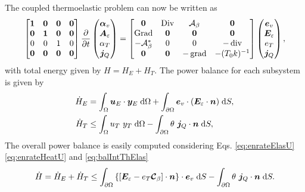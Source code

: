 The coupled thermoelastic problem can now be written as
\begin{equation}\label{eq:phsysElasHeat}
\begin{bmatrix}
\bm{1} & \bm{0} & \bm{0} & \bm{0}\\
\bm{0} & \bm{1} & \bm{0} & \bm{0}\\
0 & 0 & 1 & 0\\
\bm{0} & \bm{0} & \bm{0} & \bm{0}\\
\end{bmatrix}
\diffp{}{t}
\begin{pmatrix}
\bm{\alpha}_v \\
\bm{A}_\varepsilon \\
{\alpha}_T \\
\bm{j}_Q \\
\end{pmatrix} = 
\begin{bmatrix}
\bm{0} & \Div & \mathcal{A}_\beta & \bm{0}\\
\Grad & \bm{0} & \bm{0} & \bm{0} \\
- \mathcal{A}_\beta^* & 0 & 0 & -\div \\
\bm{0} & \bm{0} & -\grad & - (T_0 k)^{-1} \\
\end{bmatrix}
\begin{pmatrix}
\bm{e}_v \\
\bm{E}_\varepsilon \\
{e}_T \\
\bm{j}_Q \\
\end{pmatrix},
\end{equation}
with total energy given by $H=H_E + H_T$. The power balance for each subsystem is given by 
\begin{align}
\dot{H}_E &= \int_\Omega \bm{u}_E \cdot \bm{y}_E \d\Omega + \int_{\partial\Omega} \bm{e}_v \cdot (\bm{E}_\varepsilon \cdot \bm{n}) \d{S}, \label{eq:enrateElasU} \\
\dot{H}_T &\le \int_\Omega u_T \ y_T \d\Omega - \int_{\partial\Omega} \theta \ \bm{j}_Q \cdot \bm{n} \d{S}, \label{eq:enrateHeatU}
\end{align}
The overall power balance is easily computed considering Eqs. \eqref{eq:enrateElasU} \eqref{eq:enrateHeatU} and \eqref{eq:balIntThElas}
\begin{equation}\label{eq:enrateIntThElas}
\begin{aligned}
\dot{H} = \dot{H}_E + \dot{H}_T \le \int_{\partial \Omega} \left\{\left[\bm{E}_\varepsilon - e_T \bm{\mathcal{C}}_\beta \right] \cdot \bm{n}\right\}  \cdot \bm{e}_v  \d{S} - \int_{\partial\Omega} \theta \ \bm{j}_Q \cdot \bm{n} \d{S}.
\end{aligned}
\end{equation}
